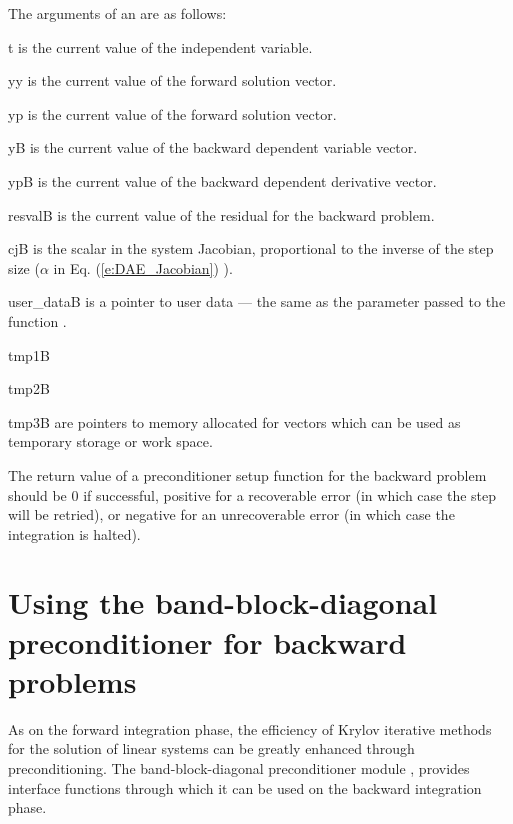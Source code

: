 {
  The arguments of an  are as follows:
  \begin{args}
  \item[t]
    is the current value of the independent variable.
  \item[yy]
    is the current value of the forward solution vector.
  \item[yp]
    is the current value of the forward solution vector.
  \item[yB]
    is the current value of the backward dependent variable vector.
  \item[ypB]
    is the current value of the backward dependent derivative vector.
  \item[resvalB]
    is the current value of the residual for the backward problem.
  \item[cjB]
    is the scalar in the system Jacobian, proportional to the inverse of the
    step size ($\alpha$ in Eq. (\ref{e:DAE_Jacobian}) ).
  \item[user\_dataB]
    is a pointer to user data --- the same as the 
    parameter passed to the function .
  \item[tmp1B]
  \item[tmp2B]
  \item[tmp3B]
    are pointers to memory allocated for vectors which can be used           
    as temporary storage or work space.    
  \end{args}
}
{
  The return value of a preconditioner setup function for the backward
  problem should be $0$ if successful, 
  positive for a recoverable error (in which case the step will be retried),     
  or negative for an unrecoverable error (in which case the integration is halted).
}
{}

\section{Using the band-block-diagonal preconditioner for backward problems}

As on the forward integration phase, the efficiency of Krylov iterative methods 
for the solution of linear systems can be greatly enhanced through preconditioning.
The band-block-diagonal preconditioner module {\idabbdpre},
provides interface functions through which it can be used on the backward integration phase.

